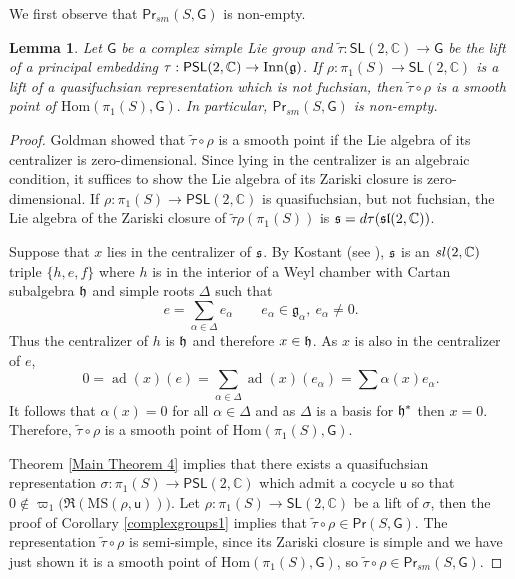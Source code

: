 \documentclass{amsart}
\theoremstyle{plain}
\newtheorem{lemma}[proposition]{Lemma}
\theoremstyle{definition}
\theoremstyle{remark}
\newcommand{\PSL}{\mathsf{PSL}}
\newcommand{\SL}{\mathsf{SL}}
\renewcommand{\P}{{\sf{Pr}}}
\renewcommand{\sf}[1]{{\mathsf{#1}}}
\newcommand{\C}{\mathbb C}
\renewcommand{\sl}{\mathfrak{sl}}
\newcommand{\<}{\left <}
\renewcommand{\>}{\right >}
\newcommand{\M}{\mathrm{MS}}
\newcommand{\co}{\sf u}
\renewcommand{\C}{\mathbb C}
\newcommand{\ad}{\operatorname{ad}}
\newcommand{\Hom}{\mathrm{Hom}}
\begin{document}
We first observe that ${\P}_{sm}(S,\sf G)$ is non-empty.

\begin{lemma} 
\label{smoothness}
Let $\sf G$ be a complex simple Lie group and $\tilde\tau:\SL(2,\C)\to \sf G$ be the lift of a principal embedding $\tau:\PSL(2,\C)\to \mathrm{Inn}(\frak g)$.
If $\rho:\pi_1(S)\to \SL(2,\C)$ is a lift of a quasifuchsian representation which is not fuchsian, then $\tilde\tau\circ \rho$ is a smooth point of $\Hom(\pi_1(S),\sf G).$
In particular, ${\P}_{sm}(S,\sf G)$ is non-empty.
\end{lemma}


\begin{proof}
Goldman \cite[\S 1.2 \& 1.3]{goldman-symplectic} showed that  $\tilde\tau\circ \rho$ is a smooth point if the Lie algebra  of its centralizer  is zero-dimensional. 
Since lying in the centralizer is an algebraic condition, it suffices to show the Lie algebra of its Zariski closure  is zero-dimensional. 
If $\rho:\pi_1(S)\to\PSL(2,\C)$ is quasifuchsian, but not fuchsian, the Lie algebra of the  Zariski closure of $\tilde\tau\rho(\pi_1(S))$ is $\frak s = d\tau(\sl(2,\C))$.

Suppose that $x$ lies in the centralizer of $\frak s$. By Kostant (see  \cite[Lemma 5.2]{Kostant}),  $\frak s$ is an $\frak\sl(2,\C)$ triple $\{h, e, f\}$  where $h$ is in the interior of a Weyl chamber  with Cartan subalgebra $\frak h$ and  simple roots $\Delta$ such that 
$$e = \sum_{\alpha \in \Delta} e_\alpha \qquad e_\alpha \in \mathfrak g_\alpha, \ e_\alpha \neq 0.$$ 
Thus the centralizer of $h$ is $\frak h$ and therefore $x \in \frak h$.   As $x$ is also in the centralizer of $e$,
$$0 = \ad(x)(e) = \sum_{\alpha \in \Delta} \ad(x)(e_\alpha) = \sum \alpha(x) e_\alpha.$$
It follows that $\alpha(x) = 0$ for all $\alpha \in \Delta$ and as $\Delta$ is a basis for $\frak h^*$ then $x =0$.
Therefore, $\tilde\tau\circ \rho$ is a smooth point of $\Hom(\pi_1(S),\sf G).$

Theorem \ref{Main Theorem 4} implies that there exists a quasifuchsian representation $\sigma:\pi_1(S)\to\mathsf{PSL}(2,\mathbb C)$ which admit a cocycle $\co$ 
so that $0\notin\varpi_1\big(\Re(\M(\rho,\co))\big)$. Let $\rho:\pi_1(S)\to\SL(2,\C)$ be a lift of $\sigma$, then the proof of Corollary \ref{complexgroups1} implies
that $\tilde\tau\circ\rho\in {\P}(S,\sf G)$. The representation $\tilde\tau\circ\rho$ is semi-simple, since its Zariski closure is simple and we have
just shown it is a smooth point of $\Hom(\pi_1(S),\sf G)$, so $\tilde\tau\circ\rho\in {\P}_{sm}(S,\sf G)$.
\end{proof}
\end{document}
